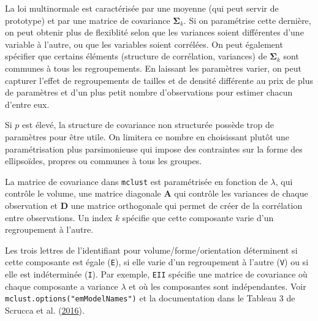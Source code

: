 \documentclass[
  11pt,
  letterpaper,
]{scrbook}
\theoremstyle{definition}
\theoremstyle{remark}
\begin{document}
La loi multinormale est caractérisée par une moyenne (qui peut servir de
prototype) et par une matrice de covariance \(\boldsymbol{\Sigma}_k\).
Si on paramétrise cette dernière, on peut obtenir plus de flexiblité
selon que les variances soient différentes d'une variable à l'autre, ou
que les variables soient corrélées. On peut également spécifier que
certains éléments (structure de corrélation, variances) de
\(\boldsymbol{\Sigma}_k\) sont communes à tous les regroupements. En
laissant les paramètres varier, on peut capturer l'effet de
regroupements de tailles et de densité différente au prix de plus de
paramètres et d'un plus petit nombre d'observations pour estimer chacun
d'entre eux.

Si \(p\) est élevé, la structure de covariance non structurée possède
trop de paramètres pour être utile. On limitera ce nombre en choisissant
plutôt une paramétrisation plus parsimonieuse qui impose des contraintes
sur la forme des ellipsoïdes, propres ou communes à tous les groupes.

La matrice de covariance dans \texttt{mclust} est paramétrisée en
fonction de \(\lambda\), qui contrôle le volume, une matrice diagonale
\(\mathbf{A}\) qui contrôle les variances de chaque observation et
\(\mathbf{D}\) une matrice orthogonale qui permet de créer de la
corrélation entre observations. Un index \(k\) spécifie que cette
composante varie d'un regroupement à l'autre.

Les trois lettres de l'identifiant pour volume/forme/orientation
déterminent si cette composante est égale (\texttt{E}), si elle varie
d'un regroupement à l'autre (\texttt{V}) ou si elle est indéterminée
(\texttt{I}). Par exemple, \texttt{EII} spécifie une matrice de
covariance où chaque composante a variance \(\lambda\) et où les
composantes sont indépendantes. Voir
\texttt{mclust.options("emModelNames")} et la documentation dans le
Tableau 3 de Scrucca et al. (\protect\hyperlink{ref-mclust5}{2016}).
\end{document}
